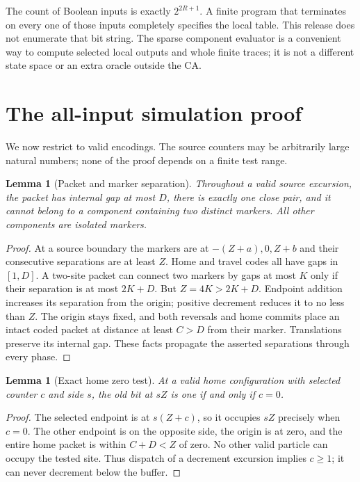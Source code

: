 \documentclass[11pt,a4paper]{article}
\numberwithin{equation}{section}
\newtheorem{lemma}[theorem]{Lemma}
\begin{document}
The count of Boolean inputs is exactly $2^{2R+1}$. A finite program that
terminates on every one of those inputs completely specifies the local table.
This release does not enumerate that bit string. The sparse component evaluator
is a convenient way to compute selected local outputs and whole finite traces;
it is not a different state space or an extra oracle outside the CA.

\section{The all-input simulation proof}\label{fpa:bc:sec:simulation}
We now restrict to valid encodings. The source counters may be arbitrarily
large natural numbers; none of the proof depends on a finite test range.

\begin{lemma}[Packet and marker separation]\label{fpa:bc:lem:separation}
Throughout a valid source excursion, the packet has internal gap at most $D$,
there is exactly one close pair, and it cannot belong to a component containing
two distinct markers. All other components are isolated markers.
\end{lemma}
\begin{proof}
At a source boundary the markers are at $-(Z+a),0,Z+b$ and their consecutive
separations are at least $Z$. Home and travel codes all have gaps in $[1,D]$.
A two-site packet can connect two markers by gaps at most $K$ only if their
separation is at most $2K+D$. But $Z=4K>2K+D$. Endpoint addition increases
its separation from the origin; positive decrement reduces it to no less
than $Z$. The origin stays fixed, and both reversals and home commits place
an intact coded packet at distance at least $C>D$ from their marker.
Translations preserve its internal gap. These facts propagate the asserted
separations through every phase.
\end{proof}

\begin{lemma}[Exact home zero test]\label{fpa:bc:lem:zero}
At a valid home configuration with selected counter $c$ and side $s$, the old
bit at $sZ$ is one if and only if $c=0$.
\end{lemma}
\begin{proof}
The selected endpoint is at $s(Z+c)$, so it occupies $sZ$ precisely when
$c=0$. The other endpoint is on the opposite side, the origin is at zero,
and the entire home packet is within $C+D<Z$ of zero. No other valid particle
can occupy the tested site. Thus dispatch of a decrement excursion implies
$c\ge1$; it can never decrement below the buffer.
\end{proof}
\end{document}
